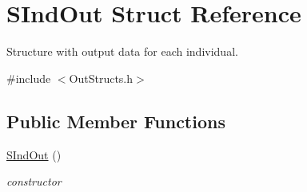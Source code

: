 \hypertarget{struct_s_ind_out}{}\section{S\+Ind\+Out Struct Reference}
\label{struct_s_ind_out}


Structure with output data for each individual.  




{\ttfamily \#include $<$Out\+Structs.\+h$>$}

\subsection*{Public Member Functions}
\begin{DoxyCompactItemize}
\item 
\mbox{\hyperlink{struct_s_ind_out_aad1ccf88303096e29ae840531092d378}{S\+Ind\+Out}} ()
\begin{DoxyCompactList}\small\item\em constructor \end{DoxyCompactList}\end{DoxyCompactItemize}
